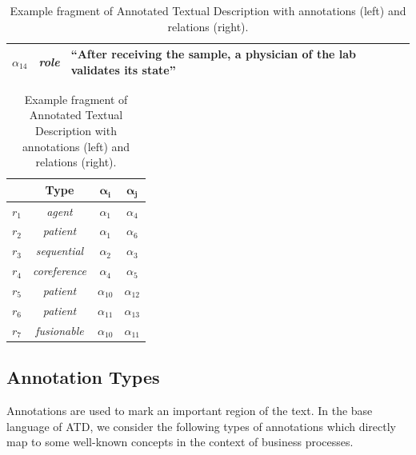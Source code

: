 \begin{table}[htb]
{\begin{tabular}{r | c l}
\hline
$\alpha_{14}$ & \emph{role} & ``After receiving the sample, a {\color{blue} \textbf{physician}} of the lab validates its state''  \\
\toprule[1pt]
\end{tabular}
\hspace{0.1cm}
\begin{tabular}{r | c c c}
& \textbf{Type} & $\mathbf{\alpha_i}$ & $\mathbf{\alpha_j}$ \\
\bottomrule[1pt]
$r_1$ & \emph{agent} & $\alpha_1$ & $\alpha_4$ \\
\hline
$r_2$ & \emph{patient} & $\alpha_1$ & $\alpha_6$ \\
\hline
$r_3$ &  \emph{sequential} & $\alpha_2$ & $\alpha_3$ \\
\hline
$r_4$ &  \emph{coreference} & $\alpha_4$ & $\alpha_5$ \\
\hline
$r_5$ & \emph{patient} & $\alpha_{10}$ & $\alpha_{12}$ \\
\hline
$r_6$ & \emph{patient} & $\alpha_{11}$ & $\alpha_{13}$ \\
\hline
  $r_7$ &  \emph{fusionable} & $\alpha_{10}$ & $\alpha_{11}$ \\
\toprule[1pt]
\end{tabular}}
\caption{Example fragment of Annotated Textual Description with annotations (left) and relations (right).}
\label{tab:example_atd}
\end{table}


\subsection{Annotation Types}

Annotations are used to mark an important region of the text. In the base
language of ATD, we consider the following types of annotations which directly
map to some well-known concepts in the context of business processes.

